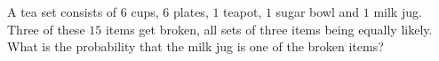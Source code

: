 A tea set consists of $6$ cups, $6$ plates, $1$ teapot, $1$ sugar bowl and $1$ milk jug. Three of these $15$ items get broken, all sets of three items being equally likely. What is the probability that the milk jug is one of the broken items?
